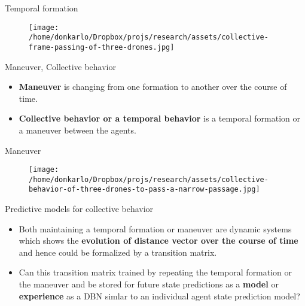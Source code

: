 \documentclass[unknownkeysallowed]{beamer}
\begin{document}
	\begin{frame}{Temporal formation}
		\begin{figure}
			\texttt{[image: /home/donkarlo/Dropbox/projs/research/assets/collective-frame-passing-of-three-drones.jpg]}
			\caption{}
		\end{figure}
	\end{frame}

	\begin{frame}{Maneuver, Collective behavior}  
		\begin{itemize}
			\item \textbf{Maneuver} is changing from one formation to another over the course of time.
			\item \textbf{Collective behavior or a temporal behavior} is a temporal formation or a maneuver between the agents. 
		\end{itemize}
	\end{frame}

	\begin{frame}{Maneuver}
		\begin{figure}
			\texttt{[image: /home/donkarlo/Dropbox/projs/research/assets/collective-behavior-of-three-drones-to-pass-a-narrow-passage.jpg]}
			\caption{}
		\end{figure}
	\end{frame}

	\begin{frame}{Predictive models for collective behavior}
		\begin{itemize}
			\item Both maintaining a temporal formation or maneuver are dynamic systems which shows the \textbf{evolution of distance vector over the course of time} and hence could be formalized by a transition matrix. 
			\item Can this transition matrix trained by repeating the temporal formation or the maneuver and be stored for future state predictions as a \textbf{model} or \textbf{experience} as a DBN simlar to an individual agent state prediction model?
		\end{itemize}
	\end{frame}
\end{document}
